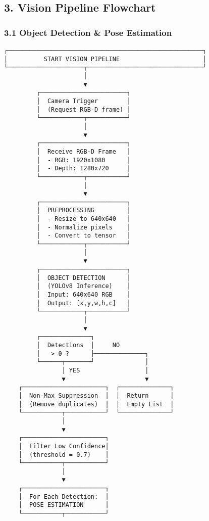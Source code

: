 \documentclass[
]{article}
\begin{document}
\hypertarget{vision-pipeline-flowchart}{%
\subsection{3. Vision Pipeline
Flowchart}\label{vision-pipeline-flowchart}}

\hypertarget{object-detection-pose-estimation}{%
\subsubsection{3.1 Object Detection \& Pose
Estimation}\label{object-detection-pose-estimation}}

\begin{verbatim}
┌──────────────────────────────────────────────────────┐
│          START VISION PIPELINE                       │
└─────────────────────┬────────────────────────────────┘
                      │
                      ▼
         ┌────────────────────────┐
         │  Camera Trigger        │
         │  (Request RGB-D frame) │
         └────────────┬───────────┘
                      │
                      ▼
         ┌────────────────────────┐
         │  Receive RGB-D Frame   │
         │  - RGB: 1920x1080      │
         │  - Depth: 1280x720     │
         └────────────┬───────────┘
                      │
                      ▼
         ┌────────────────────────┐
         │  PREPROCESSING         │
         │  - Resize to 640x640   │
         │  - Normalize pixels    │
         │  - Convert to tensor   │
         └────────────┬───────────┘
                      │
                      ▼
         ┌────────────────────────┐
         │  OBJECT DETECTION      │
         │  (YOLOv8 Inference)    │
         │  Input: 640x640 RGB    │
         │  Output: [x,y,w,h,c]   │
         └────────────┬───────────┘
                      │
                      ▼
         ┌──────────────┐
         │  Detections  │     NO
         │   > 0 ?      ├──────────────┐
         └──────┬───────┘              │
                │ YES                  │
                ▼                      ▼
    ┌───────────────────────┐  ┌──────────────┐
    │  Non-Max Suppression  │  │  Return      │
    │  (Remove duplicates)  │  │  Empty List  │
    └───────────┬───────────┘  └──────────────┘
                │
                ▼
    ┌───────────────────────┐
    │  Filter Low Confidence│
    │  (threshold = 0.7)    │
    └───────────┬───────────┘
                │
                ▼
    ┌───────────────────────┐
    │  For Each Detection:  │
    │  POSE ESTIMATION      │
    └───────────┬───────────┘

\end{verbatim}
\end{document}

